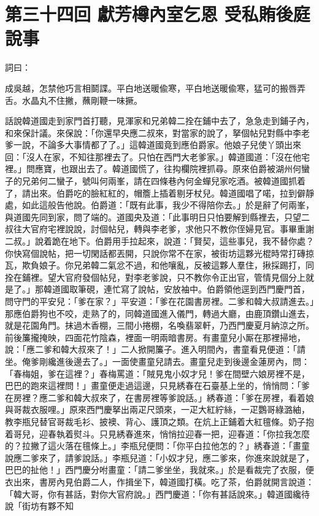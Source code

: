 
\chapter*{第三十四回 獻芳樽內室乞恩 受私賄後庭說事}


詞曰：

\begin{myquote} 
成吳越，怎禁他巧言相鬬諜。平白地送暖偸寒，平白地送暖偸寒，猛可的搬唇弄舌。水晶丸不住撇，蘸剛鞭一味撅。

\end{myquote} 

話說韓道國走到家門首打聽，見渾家和兄弟韓二拴在鋪中去了，急急走到鋪子內，和來保計議。來保說：「你還早央應二叔來，對當家的說了，拏個帖兒對縣中李老爹一說，不論多大事情都了了。」這韓道國竟到應伯爵家。他娘子兒使丫頭出來回：「沒人在家，不知往那裡去了。只怕在西門大老爹家。」韓道國道：「沒在他宅裡。」問應寶，也跟出去了。韓道國慌了，往抅欄院裡抓尋。原來伯爵被湖州何蠻子的兄弟何二蠻子，號叫何兩峯，請在四條巷內何金蟬兒家吃酒。被韓道國抓着了，請出來。伯爵吃的臉紅紅的，帽簷上插着剔牙杖兒。韓道國唱了喏，拉到僻靜處，如此這般告他說。伯爵道：「既有此事，我少不得陪你去。」於是辭了何兩峯，與道國先同到家，問了端的。道國央及道：「此事明日只怕要解到縣裡去，只望二叔往大官府宅裡說說，討個帖兒，轉與李老爹，求他只不教你侄婦見官。事畢重謝二叔。」說着跪在地下。伯爵用手拉起來，說道：「賢契，這些事兒，我不替你處？你快寫個說帖，把一切閑話都丟開，只說你常不在家，被街坊這夥光棍時常打磚掠瓦，欺負娘子。你兄弟韓二氣忿不過，和他嚷亂，反被這夥人羣住，揪採踢打，同拴在鋪裡。望大官府發個帖兒，對李老爹說，只不教你令正出官，管情見個分上就是了。」那韓道國取筆硯，連忙寫了說帖，安放袖中。伯爵領他逕到西門慶門首，問守門的平安兒：「爹在家？」平安道：「爹在花園書房裡。二爹和韓大叔請進去。」那應伯爵狗也不咬，走熟了的，同韓道國進入儀門，轉過大廳，由鹿頂鑽山進去，就是花園角門。抹過木香棚，三間小捲棚，名喚翡翠軒，乃西門慶夏月納涼之所。前後簾攏掩映，四面花竹陰森，裡面一明兩暗書房。有畫童兒小厮在那裡掃地，說：「應二爹和韓大叔來了！」二人掀開簾子。進入明間內，書童看見便道：「請坐。俺爹剛纔進後邊去了。」一面使畫童兒請去。畫童兒走到後邊金蓮房內，問：「春梅姐，爹在這裡？」春梅罵道：「賊見鬼小奴才兒！爹在間壁六娘房裡不是，巴巴的跑來這裡問！」畫童便走過這邊，只見綉春在石臺基上坐的，悄悄問：「爹在房裡？應二爹和韓大叔來了，在書房裡等爹說話。」綉春道：「爹在房裡，看着娘與哥裁衣服哩。」原來西門慶拏出兩疋尺頭來，一疋大紅紵絲，一疋鸚哥綠潞紬，教李瓶兒替官哥裁毛衫、披襖、背心、護頂之類。在炕上正鋪着大紅氊條。奶子抱着哥兒，迎春執着熨斗。只見綉春進來，悄悄拉迎春一把，迎春道：「你拉我怎麼的？拉撇了這火落在氊條上。」{}李瓶兒便問：「你平白拉他怎的？」綉春道：「畫童說應二爹來了，請爹說話。」李瓶兒道：「小奴才兒，應二爹來，你進來說就是了，巴巴的扯他！」西門慶分咐畫童：「請二爹坐坐，我就來。」於是看裁完了衣服，便衣出來，書房內見伯爵二人，作揖坐下，韓道國打橫。吃了茶，伯爵就開言說道：「韓大哥，你有甚話，對你大官府說。」西門慶道：「你有甚話說來。」韓道國纔待說「街坊有夥不知
